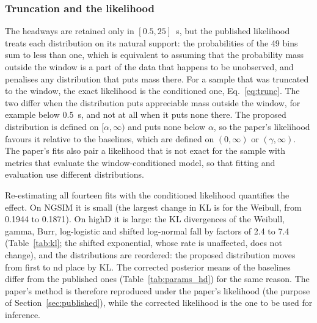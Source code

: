 \documentclass[11pt,a4paper]{article}
\numberwithin{equation}{section}
\begin{document}
\subsubsection{Truncation and the likelihood}\label{sec:lik}
The headways are retained only in $[0.5,25]$~s, but the published likelihood treats each distribution on its natural support: the probabilities of the 49 bins sum to less than one, which is equivalent to
assuming that the probability mass outside the window is a part of the data that happens to be unobserved, and penalises any distribution that puts mass there. For a sample that was truncated to the window, the exact likelihood is the conditioned one, Eq.~\eqref{eq:trunc}.
The two differ when the distribution puts appreciable mass outside the window, for example below 0.5~s, and not at all when it puts none there. The proposed distribution is defined on $[\alpha,\infty)$ and puts none below $\alpha$, so the paper's likelihood favours it relative to the
baselines, which are defined on $(0,\infty)$ or $(\gamma,\infty)$. The paper's fits also pair a likelihood that is not exact for the sample with metrics that evaluate the window-conditioned model, so that fitting and evaluation use different distributions.

Re-estimating all fourteen fits with the conditioned likelihood quantifies the effect. On NGSIM it is small (the largest change in KL is for the Weibull, from 0.1944 to 0.1871). On highD it is large: the KL divergences of the Weibull, gamma, Burr, log-logistic and shifted log-normal fall by factors of 2.4 to 7.4 (Table~\ref{tab:kl}; the shifted exponential, whose rate is unaffected, does not change),
and the distributions are reordered: the proposed distribution moves from first to \hdKLRankProp{}nd place by KL. The corrected posterior means of the baselines differ from the published ones (Table~\ref{tab:params_hd}) for the same reason. The paper's method is therefore reproduced under the paper's likelihood (the purpose of Section~\ref{sec:published}),
while the corrected likelihood is the one to be used for inference.
\end{document}
